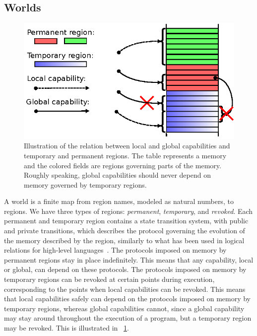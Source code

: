 \documentclass[compsoc,conference,letterpaper,fleqn]{IEEEtran}
\newcommand{\plainview}[1]{\mathrm{#1}}
\newcommand{\perma}{\plainview{perm}}
\newcommand{\temp}{\plainview{temp}}
\newcommand{\revoked}{\plainview{revoked}}
\begin{document}
\subsection{Worlds}
\begin{figure}[htbp]
  \centering
  \includegraphics{w11}
  \caption{Illustration of the relation between local and global capabilities and temporary and permanent regions. The table represents a memory and the colored fields are regions governing parts of the memory. Roughly speaking, global capabilities should never depend on memory governed by temporary regions.}
  \label{fig:cap-world}
\end{figure}
A world is a finite map from region names, modeled as natural numbers, to regions.
We have three types of regions: \emph{permanent}, \emph{temporary}, and \emph{revoked}.
Each permanent and temporary region contains a state transition system, with
public and private transitions, which describes the protocol governing
the evolution of the memory described by the region, similarly to what
has been used in logical relations for high-level
languages~\cite{Ahmed:popl09,Dreyer:jfp12,Devriese:2016ObjCap}. 
The protocols imposed on memory by permanent regions stay in place
indefinitely. This means that any capability, local or global, can
depend on these protocols. The protocols imposed on memory by temporary
regions can be revoked at certain points during execution,
corresponding to the points when local capabilities can be
revoked. This means that local capabilities safely can depend on the
protocols imposed on memory by temporary regions, whereas global
capabilities cannot, since a global capability may stay around
throughout the execution of a program, but a temporary region may be
revoked. This is illustrated in \figurename~\ref{fig:cap-world}.
\end{document}
